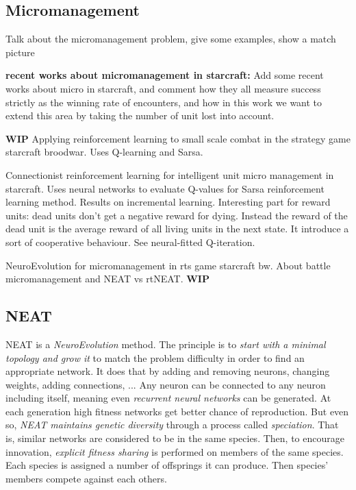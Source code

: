 \subsection{Micromanagement}

Talk about the micromanagement problem, give some examples, show a
match picture

{\bf recent works about micromanagement in starcraft:} Add some recent
works about micro in starcraft, and comment how they all measure
success strictly as the winning rate of encounters, and how in this
work we want to extend this area by taking the number of unit lost
into account.

{\bf WIP}
Applying reinforcement learning to small scale combat in the strategy
game starcraft broodwar. Uses Q-learning and Sarsa. \cite{WeWa12}

Connectionist reinforcement learning for intelligent unit micro
management in starcraft.  Uses neural networks to evaluate Q-values
for Sarsa reinforcement learning method. Results on incremental
learning.  Interesting part for reward units: dead units don’t get a
negative reward for dying.  Instead the reward of the dead unit is the
average reward of all living units in the next state.  It introduce a
sort of cooperative behaviour. See neural-fitted Q-iteration. \cite{ShBeWi11}

NeuroEvolution for micromanagement in rts game starcraft bw. About
battle micromanagement and NEAT vs rtNEAT. \cite{ShWa13}
{\bf WIP}

\subsection{NEAT}\label{subsec:neat}

NEAT is a \emph{NeuroEvolution} method. The principle is to
\emph{start with a minimal topology and grow it} to match the problem
difficulty in order to find an appropriate network.  It does that by
adding and removing neurons, changing weights, adding connections, ...
Any neuron can be connected to any neuron including itself, meaning
even \emph{recurrent neural networks} can be generated.  At each
generation high fitness networks get better chance of
reproduction. But even so, \emph{NEAT maintains genetic diversity}
through a process called \emph{speciation}. That is, similar networks
are considered to be in the same species. Then, to encourage
innovation, \emph{explicit fitness sharing} is performed on members of
the same species. Each species is assigned a number of offsprings it
can produce. Then species' members compete against each
others. \cite{StMi02}

